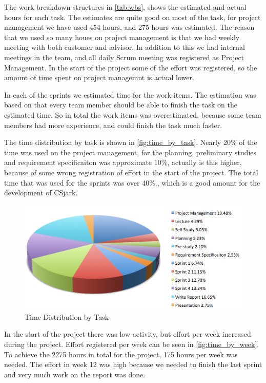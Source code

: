 The work breakdown structures in \autoref{tab:wbs}, shows the estimated and 
actual hours for each task. The estimates are quite good on most of the task, 
for project management we have used 454 hours, and 275 hours was estimated. 
The reason that we used so many houes on project management is that we had 
weekly meeting with both customer and advisor. In addition to this we had 
internal meetings in the team, and all daily Scrum meeting was registered as 
Project Management. In the start of the project some of the effort was 
registered, so the amount of time spent on project managemnt is actual lower.

In each of the sprints we estimated time for the work items. The estimation 
was based on that every team member should be able to finish the task on the 
estimated time. So in total the work items was overestimated, because some 
team members had more experience, and could finish the task much faster.

The time distribution by task is shown in \autoref{fig:time_by_task}. Nearly 
20\% of the time was used on the project management, for the planning, 
preliminary studies and requirement specificaiton was approximate 10\%, 
actually is this higher, because of some wrong registration of effort in the 
start of the project. The total time that was used for the sprints was over 
40\%., which is a good amount for the development of CSjark. 

\begin{figure}[htb]
	\center
	\includegraphics[width=\textwidth]{./evaluation/img/piechart_time}
	\caption{Time Distribution by Task\label{fig:time_by_task}}
\end{figure}

In the start of the project there was low activity, but effort per week 
increased during the project. Effort registered per week can be seen in 
\autoref{fig:time_by_week}. To achieve the 2275 hours in total for the 
project, 175 hours per week was needed. The effort in week 12 was high because 
we needed to finish the last sprint and very much work on the report was done.

